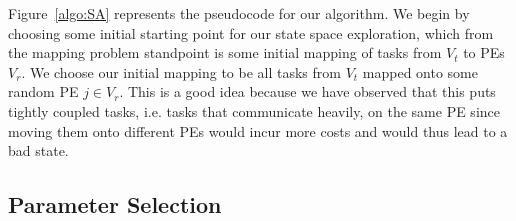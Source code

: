 Figure~\ref{algo:SA} represents the pseudocode for our algorithm. We begin by
choosing some initial starting point for our state space exploration, which from
the mapping problem standpoint is some initial mapping of tasks from $V_t$ to
PEs $V_r$. We choose our initial mapping to be all tasks from $V_t$ mapped onto
some random PE $j \in V_r$. This is a good idea because we have observed that
this puts tightly coupled tasks, i.e. tasks that communicate heavily, on the
same PE since moving them onto different PEs would incur more costs and would thus
lead to a bad state. 

\subsection{Parameter Selection}


